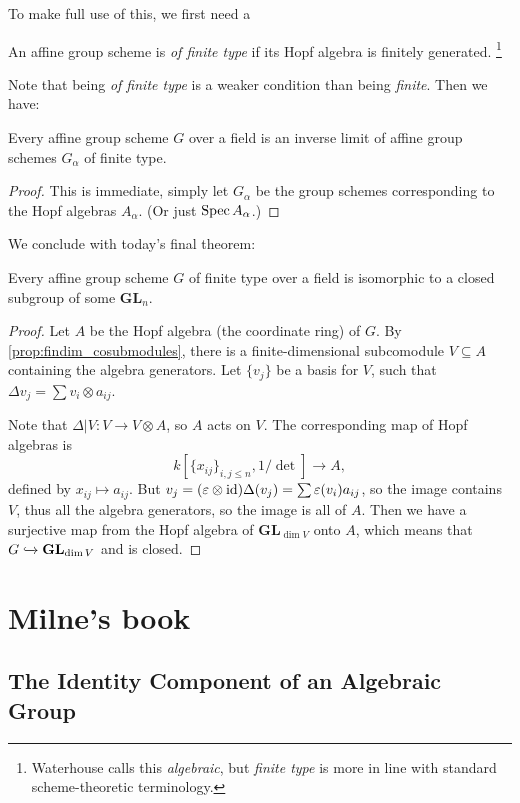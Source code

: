\documentclass{memoir}
\begin{document}
To make full use of this, we first need a 
\begin{definition}\label{def:finite_type}
	An affine group scheme is \emph{of finite type} if its Hopf algebra is finitely generated. \footnote{Waterhouse calls this \emph{algebraic}, but \emph{finite type} is more in line with standard scheme-theoretic terminology.}
\end{definition}
Note that being \emph{of finite type} is a weaker condition than being \emph{finite}.
Then we have:
\begin{corollary}\label{cor:finite_type_is_inverse_limit}
	Every affine group scheme $ G $ over a field is an inverse limit of affine group schemes $ G_\alpha $ of finite type.
\end{corollary}

\begin{proof}
	This is immediate, simply let $ G_\alpha $ be the group schemes corresponding to the Hopf algebras $ A_\alpha $. (Or just $ \operatorname{Spec} A_\alpha $.)
\end{proof}

We conclude with today's final theorem:
\begin{theorem}\label{thm:everything_in_GL}
	Every affine group scheme $ G $ of finite type over a field is isomorphic to a closed subgroup of some $ \mathbf{GL}_n $.
\end{theorem}
\begin{proof}
 Let $ A $ be the Hopf algebra (the coordinate ring) of $ G $. By \cref{prop:findim_cosubmodules}, there is a finite-dimensional subcomodule $ V \subseteq A  $ containing the algebra generators. Let $ \{v_j\} $ be a basis for $ V $, such that $ \Delta v_j=\sum v_i\otimes a_{ij} $.
 
 Note that $ \Delta|V\colon V\to V\otimes A $, so $ A $ acts on $ V $. The corresponding map of Hopf algebras is 
 \[ k[\{x_{ij}\}_{i,j\le n}, {1}/{\det}]\to A, \]
 defined by $ x_{ij}\mapsto a_{ij} $.
 But $ v_j =(\varepsilon\otimes\operatorname{id})\Delta(v_j)=\sum\varepsilon(v_i)a_{ij} $, so the image contains $ V $, thus all the algebra generators, so the image is all of $ A $. Then we have a surjective map from the Hopf algebra of $ \mathbf{GL}_{\dim V} $ onto $ A $, which means that $ G\xhookrightarrow{} \mathbf{GL}_{\dim V} $ and is closed.
\end{proof}
\chapter{Milne's book}
\section{The Identity Component of an Algebraic Group}
\end{document}
